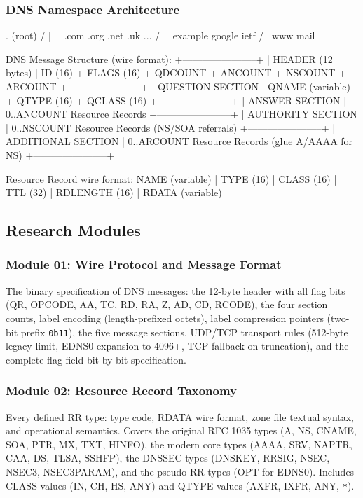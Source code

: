 \documentclass[11pt,letterpaper]{article}
\begin{document}
\subsubsection{DNS Namespace Architecture}

\begin{asciibox}
                         . (root)
                    /    |    \    \
                 .com  .org  .net  .uk  ...
                /   \    \
         example   google  ietf
         /     \
        www    mail
\end{asciibox}

\begin{asciibox}
DNS Message Structure (wire format):
+-----------------------+ 
| HEADER (12 bytes)     |  ID (16) + FLAGS (16) + QDCOUNT + ANCOUNT + NSCOUNT + ARCOUNT
+-----------------------+
| QUESTION SECTION      |  QNAME (variable) + QTYPE (16) + QCLASS (16)
+-----------------------+
| ANSWER SECTION        |  0..ANCOUNT Resource Records
+-----------------------+
| AUTHORITY SECTION     |  0..NSCOUNT Resource Records (NS/SOA referrals)
+-----------------------+
| ADDITIONAL SECTION    |  0..ARCOUNT Resource Records (glue A/AAAA for NS)
+-----------------------+

Resource Record wire format:
NAME (variable) | TYPE (16) | CLASS (16) | TTL (32) | RDLENGTH (16) | RDATA (variable)
\end{asciibox}

\subsection{Research Modules}

\subsubsection{Module 01: Wire Protocol and Message Format}
The binary specification of DNS messages: the 12-byte header with all flag bits (QR, OPCODE, AA, TC, RD, RA, Z, AD, CD, RCODE), the four section counts, label encoding (length-prefixed octets), label compression pointers (two-bit prefix \texttt{0b11}), the five message sections, UDP/TCP transport rules (512-byte legacy limit, EDNS0 expansion to 4096+, TCP fallback on truncation), and the complete flag field bit-by-bit specification.

\subsubsection{Module 02: Resource Record Taxonomy}
Every defined RR type: type code, RDATA wire format, zone file textual syntax, and operational semantics. Covers the original RFC 1035 types (A, NS, CNAME, SOA, PTR, MX, TXT, HINFO), the modern core types (AAAA, SRV, NAPTR, CAA, DS, TLSA, SSHFP), the DNSSEC types (DNSKEY, RRSIG, NSEC, NSEC3, NSEC3PARAM), and the pseudo-RR types (OPT for EDNS0). Includes CLASS values (IN, CH, HS, ANY) and QTYPE values (AXFR, IXFR, ANY, \texttt{*}).
\end{document}
